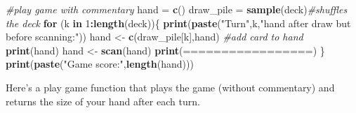 \documentclass[
]{book}
\newenvironment{Shaded}{\begin{snugshade}}{\end{snugshade}}
\newcommand{\CommentTok}[1]{\textcolor[rgb]{0.56,0.35,0.01}{\textit{#1}}}
\newcommand{\ControlFlowTok}[1]{\textcolor[rgb]{0.13,0.29,0.53}{\textbf{#1}}}
\newcommand{\DecValTok}[1]{\textcolor[rgb]{0.00,0.00,0.81}{#1}}
\newcommand{\FunctionTok}[1]{\textcolor[rgb]{0.13,0.29,0.53}{\textbf{#1}}}
\newcommand{\NormalTok}[1]{#1}
\newcommand{\OtherTok}[1]{\textcolor[rgb]{0.56,0.35,0.01}{#1}}
\newcommand{\SpecialCharTok}[1]{\textcolor[rgb]{0.81,0.36,0.00}{\textbf{#1}}}
\newcommand{\StringTok}[1]{\textcolor[rgb]{0.31,0.60,0.02}{#1}}
\theoremstyle{definition}
\theoremstyle{definition}
\theoremstyle{definition}
\theoremstyle{definition}
\theoremstyle{remark}
\begin{document}
\begin{Shaded}
\begin{Highlighting}[]
\CommentTok{\#play game with commentary}
\NormalTok{hand }\OtherTok{=} \FunctionTok{c}\NormalTok{()}
\NormalTok{draw\_pile }\OtherTok{=} \FunctionTok{sample}\NormalTok{(deck)}\CommentTok{\#shuffles the deck}
\ControlFlowTok{for}\NormalTok{ (k }\ControlFlowTok{in} \DecValTok{1}\SpecialCharTok{:}\FunctionTok{length}\NormalTok{(deck))\{}
  \FunctionTok{print}\NormalTok{(}\FunctionTok{paste}\NormalTok{(}\StringTok{"Turn"}\NormalTok{,k,}\StringTok{"hand after draw but before scanning:"}\NormalTok{))}
\NormalTok{  hand }\OtherTok{\textless{}{-}} \FunctionTok{c}\NormalTok{(draw\_pile[k],hand) }\CommentTok{\#add card to hand}
  \FunctionTok{print}\NormalTok{(hand)}
\NormalTok{  hand }\OtherTok{\textless{}{-}} \FunctionTok{scan}\NormalTok{(hand)}
  \FunctionTok{print}\NormalTok{(}\StringTok{\textquotesingle{}=================\textquotesingle{}}\NormalTok{)}
\NormalTok{\}}
\FunctionTok{print}\NormalTok{(}\FunctionTok{paste}\NormalTok{(}\StringTok{"Game score:"}\NormalTok{,}\FunctionTok{length}\NormalTok{(hand)))}
\end{Highlighting}
\end{Shaded}

Here's a play game function that plays the game (without commentary) and returns the size of your hand after each turn.
\end{document}
